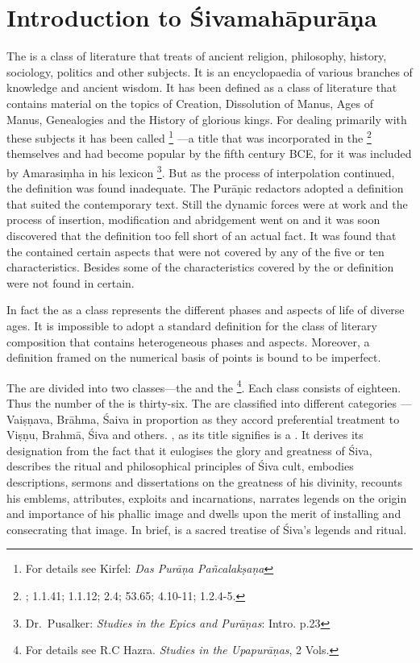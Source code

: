 {}
\chapter*{Introduction to Śivamahāpurāṇa}

The  is a class of literature that treats of ancient religion,
philosophy, history, sociology, politics and other subjects. It is an
encyclopaedia of various branches of knowledge and ancient wisdom. It has been
defined as a class of literature that contains material on the topics of
Creation, Dissolution of Manus, Ages of Manus, Genealogies and the History of
glorious kings. For dealing primarily with these subjects it has been called
\footnote{For details see Kirfel: \emph{Das Purāṇa Pañcalakṣaṇa}}
—a title that was incorporated in the \footnote{;
 1.1.41;  1.1.12;  2.4;  53.65;
 4.10-11;  1.2.4-5.} themselves and had become popular by
the fifth century BCE, for it was included by Amarasiṃha in his lexicon 
\footnote{Dr.~Pusalker: \emph{Studies in the Epics and Purāṇas}: Intro. p.23}.
But as the process of interpolation continued, the  definition
was found inadequate. The Purāṇic redactors adopted a  definition
that suited the contemporary text. Still the dynamic forces were at work and
the process of insertion, modification and abridgement went on and it was soon
discovered that the  definition too fell short of an actual fact.
It was found that the contained certain aspects that were not
covered by any of the five or ten characteristics. Besides some of the
characteristics covered by the  or  definition
were not found in certain.

In fact the  as a class represents the different phases and aspects
of life of diverse ages. It is impossible to adopt a standard definition for
the class of literary composition that contains heterogeneous phases and aspects.
Moreover, a definition framed on the numerical basis of points is bound to be
imperfect.

The are divided into two classes—the  and
the  \footnote{For details see R.C Hazra. \emph{Studies in
the Upapurāṇas}, 2 Vols.}. Each class consists of eighteen. Thus
the number of the is thirty-six. The  are
classified into different categories — Vaiṣṇava, Brāhma, Śaiva \etc in proportion
as they accord preferential treatment to Viṣṇu, Brahmā, Śiva and others.
, as its title signifies is a . It derives its
designation from the fact that it eulogises the glory and greatness of Śiva,
describes the ritual and philosophical principles of Śiva cult, embodies
descriptions, sermons and dissertations on the greatness of his divinity,
recounts his emblems, attributes, exploits and incarnations, narrates legends on
the origin and importance of his phallic image and dwells upon the merit of
installing and consecrating that image. In brief,  is a sacred
treatise of Śiva’s legends and ritual.

